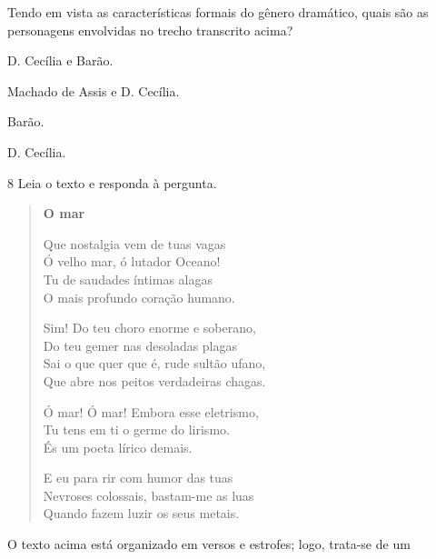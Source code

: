
Tendo em vista as características formais do gênero dramático, quais são
as personagens envolvidas no trecho transcrito acima?

\begin{escolha}

  \item D. Cecília e Barão.

  \item Machado de Assis e D. Cecília.

  \item Barão.

  \item D. Cecília.

\end{escolha} 


\num{8} Leia o texto e responda à pergunta.

\begin{verse}
\textbf{O mar}

Que nostalgia vem de tuas vagas\\
Ó velho mar, ó lutador Oceano!\\
Tu de saudades íntimas alagas\\
O mais profundo coração humano.

Sim! Do teu choro enorme e soberano,\\
Do teu gemer nas desoladas plagas\\
Sai o que quer que é, rude sultão ufano,\\
Que abre nos peitos verdadeiras chagas.

Ó mar! Ó mar! Embora esse eletrismo,\\
Tu tens em ti o germe do lirismo.\\
És um poeta lírico demais.

E eu para rir com humor das tuas\\
Nevroses colossais, bastam-me as luas\\
Quando fazem luzir os seus metais.
\end{verse}


O texto acima está organizado em versos e estrofes; logo, trata-se de
um

